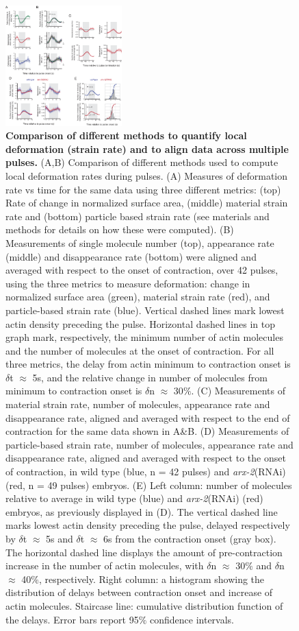 
\begin{figure}[!htbp]
\centering
\includegraphics[width=0.4\textwidth]{pulse/Figure2-11}

\caption{ \label{fig:2211} \textbf{Comparison of different methods to quantify local deformation (strain rate) and to align data across multiple pulses.} (A,B) Comparison of different methods used to compute local deformation rates during pulses. (A) Measures of deformation rate vs time for the same data using three different metrics: (top) Rate of change in normalized surface area, (middle) material strain rate and (bottom) particle based strain rate (see materials and methods for details on how these were computed). (B) Measurements of single molecule number (top), appearance rate (middle) and disappearance rate (bottom) were aligned and averaged with respect to the onset of contraction, over 42 pulses, using the three metrics to measure deformation: change in normalized surface area (green), material strain rate (red), and particle-based strain rate (blue). Vertical dashed lines mark lowest actin density preceding the pulse. Horizontal dashed lines in top graph mark, respectively, the minimum number of actin molecules and the number of molecules at the onset of contraction. For all three metrics, the delay from actin minimum to contraction onset is $\delta$t $\approx$ 5s, and the relative change in number of molecules from minimum to contraction onset is $\delta$n $\approx$ 30$\%$. (C) Measurements of material strain rate, number of molecules, appearance rate and disappearance rate, aligned and averaged with respect to the end of contraction for the same data shown in A\&B. (D) Measurements of particle-based strain rate, number of molecules, appearance rate and disappearance rate, aligned and averaged with respect to the onset of contraction, in wild type (blue, n = 42 pulses) and \textit{arx-2}(RNAi) (red, n = 49 pulses) embryos. (E) Left column: number of molecules relative to average in wild type (blue) and \textit{arx-2}(RNAi) (red) embryos, as previously displayed in (D). The vertical dashed line marks lowest actin density preceding the pulse, delayed respectively by $\delta$t $\approx$ 5s and $\delta$t $\approx$ 6s from the contraction onset (gray box). The horizontal dashed line displays the amount of pre-contraction increase in the number of actin molecules, with $\delta$n $\approx$ 30$\%$ and $\delta$n $\approx$ 40$\%$, respectively. Right column: a histogram showing the distribution of delays between contraction onset and increase of actin molecules. Staircase line: cumulative distribution function of the delays. Error bars report 95$\%$ confidence intervals.}
\end{figure}
